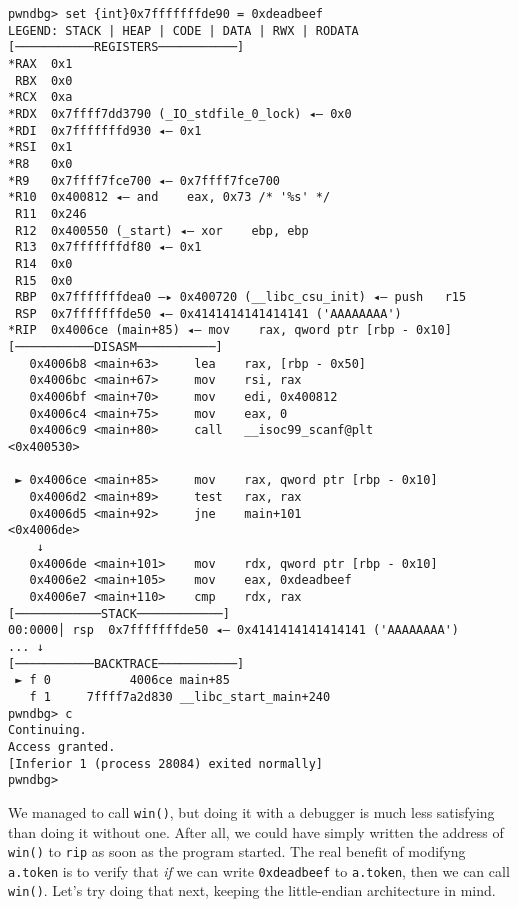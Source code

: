 \begin{lstlisting}
pwndbg> set {int}0x7fffffffde90 = 0xdeadbeef
LEGEND: STACK | HEAP | CODE | DATA | RWX | RODATA
[───────────REGISTERS───────────]
*RAX  0x1
 RBX  0x0
*RCX  0xa
*RDX  0x7ffff7dd3790 (_IO_stdfile_0_lock) ◂— 0x0
*RDI  0x7fffffffd930 ◂— 0x1
*RSI  0x1
*R8   0x0
*R9   0x7ffff7fce700 ◂— 0x7ffff7fce700
*R10  0x400812 ◂— and    eax, 0x73 /* '%s' */
 R11  0x246
 R12  0x400550 (_start) ◂— xor    ebp, ebp
 R13  0x7fffffffdf80 ◂— 0x1
 R14  0x0
 R15  0x0
 RBP  0x7fffffffdea0 —▸ 0x400720 (__libc_csu_init) ◂— push   r15
 RSP  0x7fffffffde50 ◂— 0x4141414141414141 ('AAAAAAAA')
*RIP  0x4006ce (main+85) ◂— mov    rax, qword ptr [rbp - 0x10]
[───────────DISASM───────────]
   0x4006b8 <main+63>     lea    rax, [rbp - 0x50]
   0x4006bc <main+67>     mov    rsi, rax
   0x4006bf <main+70>     mov    edi, 0x400812
   0x4006c4 <main+75>     mov    eax, 0
   0x4006c9 <main+80>     call   __isoc99_scanf@plt            <0x400530>
 
 ► 0x4006ce <main+85>     mov    rax, qword ptr [rbp - 0x10]
   0x4006d2 <main+89>     test   rax, rax
   0x4006d5 <main+92>     jne    main+101                      <0x4006de>
    ↓
   0x4006de <main+101>    mov    rdx, qword ptr [rbp - 0x10]
   0x4006e2 <main+105>    mov    eax, 0xdeadbeef
   0x4006e7 <main+110>    cmp    rdx, rax
[────────────STACK────────────]
00:0000│ rsp  0x7fffffffde50 ◂— 0x4141414141414141 ('AAAAAAAA')
... ↓
[───────────BACKTRACE───────────]
 ► f 0           4006ce main+85
   f 1     7ffff7a2d830 __libc_start_main+240
pwndbg> c
Continuing.
Access granted.
[Inferior 1 (process 28084) exited normally]
pwndbg> 
\end{lstlisting}

We managed to call \texttt{win()}, but doing it with a debugger is much less
satisfying than doing it without one. After all, we could have simply written
the address of \texttt{win()} to \texttt{rip} as soon as the program started.
The real benefit of modifyng \texttt{a.token} is to verify that \emph{if} we can
write \texttt{0xdeadbeef} to \texttt{a.token}, then we can call \texttt{win()}.
Let's try doing that next, keeping the little-endian architecture in mind.

